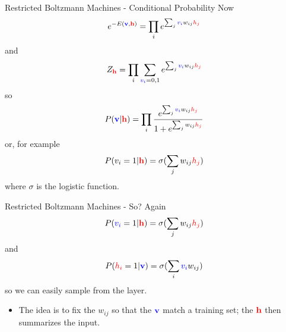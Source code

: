 \documentclass{beamer}
\newcommand{\vi}{\color{blue}v_i\color{black}}
\newcommand{\hj}{\color{red}h_j\color{black}}
\newcommand{\hi}{\color{red}h_i\color{black}}
\newcommand{\vbf}{\color{blue}\mathbf{v}\color{black}}
\newcommand{\hbf}{\color{red}\mathbf{h}\color{black}}
\newcommand{\cor}{\color{reddish}{}}
\begin{document}
\begin{frame}{Restricted Boltzmann Machines - Conditional Probability}
\color{reddish}Now\color{black}
$$
e^{-E(\vbf,\hbf)}=\prod_ie^{\sum_j\vi w_{ij} \hj}
$$
\color{reddish}and\color{black}{}
$$
Z_{\hbf}= \prod_i\sum_{\vi=0,1}e^{\sum_j\vi w_{ij} \hj}
$$
\color{reddish}so\color{black}
$$
  P(\vbf|\hbf)=\prod_i \frac{e^{\sum_j\vi w_{ij} \hj}}{1+e^{\sum_jw_{ij} \hj}}
$$
\color{reddish}or, for example\color{black}
$$
  P(v_i=1|\hbf)=\sigma(\sum_jw_{ij}\hj)
$$
\color{reddish}where\color{black}{} $\sigma$\color{reddish}{} is the logistic function.\color{black}
\end{frame}



\begin{frame}{Restricted Boltzmann Machines - So?}
\color{reddish}Again\color{black}
$$
  P(\vi=1|\hbf)=\sigma(\sum_jw_{ij}\hj)
$$
\color{reddish}and\color{black}{}
$$
  P(\hi=1|\vbf)=\sigma(\sum_i \vi w_{ij})
$$
  \color{reddish}so we can easily sample from the layer.
  \begin{itemize}
    \item \cor{} The idea is to fix the $w_{ij}$ so that the $\vbf$\cor{} match a training set; the $\hbf$\cor{} then summarizes the input. 
\end{itemize}
\end{frame}
\end{document}
